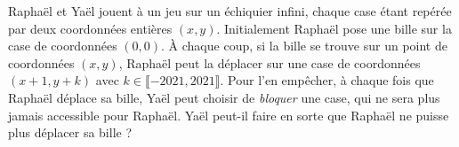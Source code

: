 Raphaël et Yaël jouent à un jeu sur un échiquier infini, chaque case étant repérée par deux coordonnées entières $(x, y)$. Initialement Raphaël pose une bille sur la case de coordonnées $(0, 0)$. À chaque coup, si la bille se trouve sur un point de coordonnées $(x, y)$, Raphaël peut la déplacer sur une case de coordonnées $(x + 1, y + k)$ avec $k\in \llbracket - 2021, 2021 \rrbracket$. Pour l'en empêcher, à chaque fois que Raphaël déplace sa bille, Yaël peut choisir de \textit{bloquer} une case, qui ne sera plus jamais accessible pour Raphaël. Yaël peut-il faire en sorte que Raphaël ne puisse plus déplacer sa bille ?
